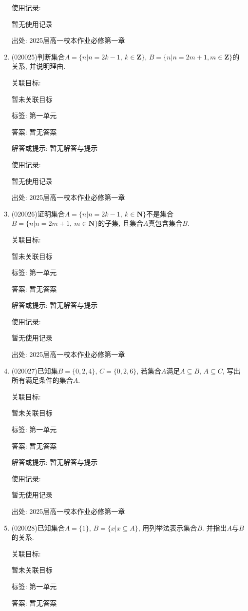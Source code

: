 \documentclass[10pt,a4paper]{article}
\begin{document}
\begin{enumerate}[1.]
使用记录:

暂无使用记录


出处: 2025届高一校本作业必修第一章
\item { (020025)}判断集合$A=\{n|n=2k-1,\ k\in \mathbf{Z}\}$, $B=\{n|n=2m+1,m\in \mathbf{Z}\}$的关系, 并说明理由.


关联目标:

暂未关联目标



标签: 第一单元

答案: 暂无答案

解答或提示: 暂无解答与提示

使用记录:

暂无使用记录


出处: 2025届高一校本作业必修第一章
\item { (020026)}证明集合$A=\{n|n=2k-1,\ k\in \mathbf{N}\}$不是集合$B=\{n|n=2m+1, \ m\in \mathbf{N}\}$的子集, 且集合$A$真包含集合$B$.


关联目标:

暂未关联目标



标签: 第一单元

答案: 暂无答案

解答或提示: 暂无解答与提示

使用记录:

暂无使用记录


出处: 2025届高一校本作业必修第一章
\item { (020027)}已知集$B=\{0, 2, 4\}$, $C=\{0, 2, 6\}$, 若集合$A$满足$A\subseteq B$, $A\subseteq C$, 写出所有满足条件的集合$A$.


关联目标:

暂未关联目标



标签: 第一单元

答案: 暂无答案

解答或提示: 暂无解答与提示

使用记录:

暂无使用记录


出处: 2025届高一校本作业必修第一章
\item { (020028)}已知集合$A=\{1\}$, $B=\{x|x\subseteq A\}$, 用列举法表示集合$B$. 并指出$A$与$B$的关系.


关联目标:

暂未关联目标



标签: 第一单元

答案: 暂无答案


\end{enumerate}
\end{document}
